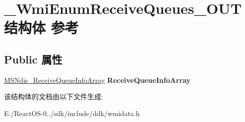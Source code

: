 \hypertarget{struct___wmi_enum_receive_queues___o_u_t}{}\section{\+\_\+\+Wmi\+Enum\+Receive\+Queues\+\_\+\+O\+U\+T结构体 参考}
\label{struct___wmi_enum_receive_queues___o_u_t}
\subsection*{Public 属性}
\begin{DoxyCompactItemize}
\item 
\mbox{\label{struct___wmi_enum_receive_queues___o_u_t_a186f3fc8e14b8240e9dc90fb80327ac2}} 
\hyperlink{struct___m_s_ndis___receive_queue_info_array}{M\+S\+Ndis\+\_\+\+Receive\+Queue\+Info\+Array} {\bfseries Receive\+Queue\+Info\+Array}
\end{DoxyCompactItemize}


该结构体的文档由以下文件生成\+:\begin{DoxyCompactItemize}
\item 
E\+:/\+React\+O\+S-\/0../sdk/include/ddk/wmidata.\+h\end{DoxyCompactItemize}
